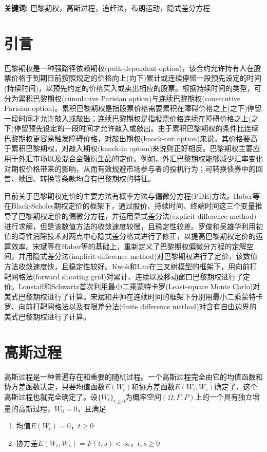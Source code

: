 \documentclass{ctexart} %
\begin{document}
{\bf 关键词: }巴黎期权，高斯过程，追赶法，布朗运动，隐式差分方程

\section{引言}
巴黎期权是一种强路径依赖期权(path-dependent option)，该合约允许持有人在股票价格于到期日前按照规定的价格向上(向下)累计或连续停留一段预先设定的时间(持续时间)，以预先约定的价格买入或卖出相应的股票。根据持续时间的类型，可分为累积巴黎期权(cumulative Parisian option)与连续巴黎期权(consecutive Parisian option)。累积巴黎期权是指股票价格需要累积在障碍价格之上(之下)停留一段时间才允许敲入或敲出；连续巴黎期权是指股票价格连续在障碍价格之上(之下)停留预先设定的一段时间才允许敲入或敲出。由于累积巴黎期权的条件比连续巴黎期权更容易触发障碍价格，对敲出期权(knock-out option)来说，其价格要高于累积巴黎期权，对敲入期权(knock-in option)来说则正好相反。巴黎期权主要应用于外汇市场以及混合金融衍生品的定价。例如，外汇巴黎期权能够减少汇率变化对期权价格带来的影响，从而有效规避市场参与者的投机行为；可转换债券中的回售、赎回、转换等条款均含有巴黎期权的特征。

目前关于巴黎期权定价的主要方法有概率方法与偏微分方程(PDE)方法。Haber等在Black-Scholes期权定价的框架下，通过股价、持续时间、终端时间这三个变量推导了巴黎期权定价的偏微分方程，并运用显式差分法(explicit difference method)进行求解，但是该数值方法的收敛速度较慢，且稳定性较差。罗俊和吴雄华利用初值的奇性消除技术对两点中心隐式差分格式进行了修正，以提高巴黎期权定价的运算效率。宋斌等在Haber等的基础上，重新定义了巴黎期权偏微分方程的定解空间，并用隐式差分法(implicit difference method)对巴黎期权进行了定价，该数值方法收敛速度快，且稳定性较好。Kwok和Lau在三叉树模型的框架下，用向前打靶网格法(forward shooting grid)对累计、连续以及移动窗口巴黎期权进行了定价。Lonstaff和Schwartz首次利用最小二乘蒙特卡罗(Least-square Monte Carlo)对美式巴黎期权进行了计算。宋斌和井帅在连续时间的框架下分别用最小二乘蒙特卡罗、向前打靶网格法以及有限差分法(finite difference method)对含有自由边界的美式巴黎期权进行了计算。

\section{高斯过程}
高斯过程是一种普遍存在和重要的随机过程。一个高斯过程完全由它的均值函数和协方差函数决定，只要均值函数$E(W_t)$和协方差函数$E(W_t,W_s)$确定了，这个高斯过程也就完全确定了。设$\{W_t\}_{t\geq 0}$为概率空间$(\Omega,F,P)$上的一个具有独立增量的高斯过程，$W_0=0$，且满足
\begin{enumerate}[(1)]
\item 均值$E(W_t)=0$，$t\geq 0$
\item 协方差$E(W_t,W_s)=F(t,s)<\infty$，$t,s\geq 0$
\end{enumerate}
\end{document}
